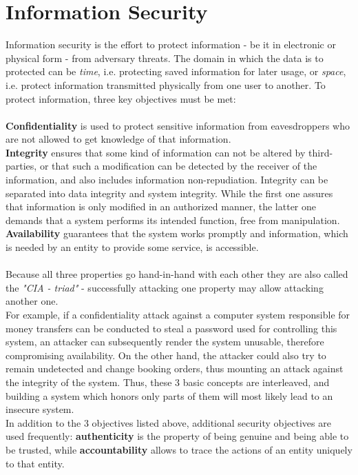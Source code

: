 \label{chap2}
\section{Information Security}

Information security is the effort to protect information - be it in electronic or physical form - from adversary threats. 
The domain in which the data is to protected can be \textit{time}, i.e. protecting saved information for later usage, or \textit{space}, i.e. protect information
transmitted physically from one user to another. To protect information, three key objectives must be met:
\\
\\
\textbf{Confidentiality} is used to protect sensitive information from eavesdroppers who are not allowed to get knowledge of that information.
\\
\textbf{Integrity} ensures that some kind of information can not be altered by third-parties, or that such a modification can be detected by the
receiver of the information, and also includes information non-repudiation. Integrity can be separated into data integrity and system integrity. While the first one assures
that information is only modified in an authorized manner, the latter one demands that a system performs its intended function, free from manipulation.
\\
\textbf{Availability} guarantees that the system works promptly and information, which is needed by an entity to provide some service, is accessible.
\\
\\
Because all three properties go hand-in-hand with each other they are also called the \textit{"CIA - triad"} \cite{stallings} - successfully attacking one property may allow attacking
another one. 
\\
For example, if a
confidentiality attack against a computer system responsible for money transfers can be conducted to steal a password used for controlling this system,
an attacker
can subsequently render the system unusable, therefore compromising availability. On the other hand, the attacker could also try to remain undetected and change
booking orders, thus mounting an attack against the integrity of the system. Thus, these 3 basic concepts are interleaved, and building a system which honors
only parts of them will most likely lead to an insecure system.
\\
In addition to the 3 objectives listed above, additional security objectives are used frequently: \textbf{authenticity} is the property of being genuine and being able to be 
trusted, while \textbf{accountability} allows to trace the actions of an entity uniquely to that entity.
